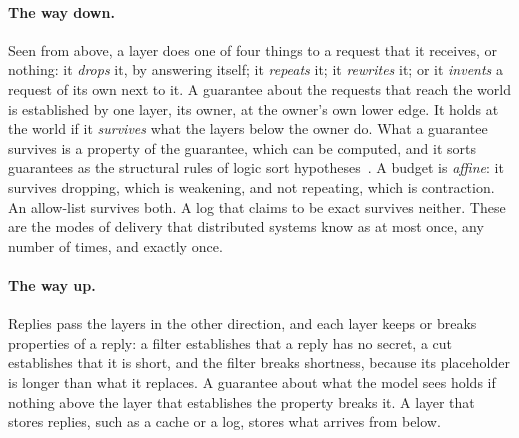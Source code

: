 \documentclass[acmsmall,nonacm,screen]{acmart}
\begin{document}
\paragraph{The way down.} Seen from above, a layer does one of four things to a request that
it receives, or nothing: it \emph{drops} it, by answering itself; it \emph{repeats} it; it
\emph{rewrites} it; or it \emph{invents} a request of its own next to it. A guarantee about
the requests that reach the world is established by one layer, its owner, at the owner's own
lower edge. It holds at the world if it \emph{survives} what the layers below the owner do.
What a guarantee survives is a property of the guarantee, which can be computed, and it sorts
guarantees as the structural rules of logic sort hypotheses~\cite{girard1987}. A budget is
\emph{affine}: it survives dropping, which is weakening, and not repeating, which is
contraction. An allow-list survives both. A log that claims to be exact survives neither.
These are the modes of delivery that distributed systems know as at most once, any number of
times, and exactly once.

\paragraph{The way up.} Replies pass the layers in the other direction, and each layer keeps
or breaks properties of a reply: a filter establishes that a reply has no secret, a cut
establishes that it is short, and the filter breaks shortness, because its placeholder is
longer than what it replaces. A guarantee about what the model sees holds if nothing above
the layer that establishes the property breaks it. A layer that stores replies, such as a
cache or a log, stores what arrives from below.
\end{document}
